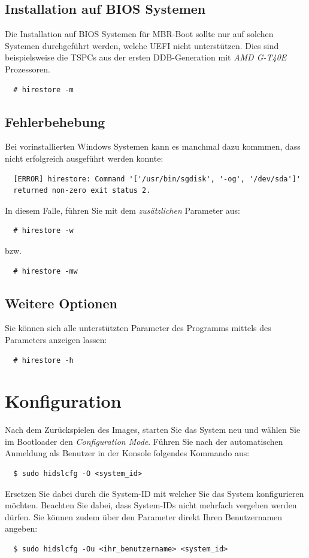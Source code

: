\documentclass[a4paper,11pt,authoryear]{article}
\begin{document}
\subsection{Installation auf BIOS Systemen}
Die Installation auf BIOS Systemen für MBR-Boot sollte nur auf solchen Systemen durchgeführt werden, welche UEFI nicht unterstützen.
Dies sind beispielsweise die TSPCs aus der ersten DDB-Generation mit \emph{AMD G-T40E} Prozessoren.
\begin{verbatim}
  # hirestore -m
\end{verbatim}
\subsection{Fehlerbehebung}
Bei vorinstallierten Windows Systemen kann es manchmal dazu kommmen, dass  nicht erfolgreich ausgeführt werden konnte:
\begin{verbatim}
  [ERROR] hirestore: Command '['/usr/bin/sgdisk', '-og', '/dev/sda']' 
  returned non-zero exit status 2.
\end{verbatim}
In diesem Falle, führen Sie  mit dem \emph{zusätzlichen} Parameter  aus:
\begin{verbatim}
  # hirestore -w
\end{verbatim}
bzw.
\begin{verbatim}
  # hirestore -mw
\end{verbatim}
\subsection{Weitere Optionen}
Sie können sich alle unterstützten Parameter des Programms  mittels des Parameters  anzeigen lassen:
\begin{verbatim}
  # hirestore -h
\end{verbatim}

\section{Konfiguration}
Nach dem Zurückspielen des Images, starten Sie das System neu und wählen Sie im Bootloader den \emph{Configuration Mode}.
Führen Sie nach der automatischen Anmeldung als Benutzer  in der Konsole folgendes Kommando aus:
\begin{verbatim}
  $ sudo hidslcfg -O <system_id>
\end{verbatim}
Ersetzen Sie dabei  durch die System-ID mit welcher Sie das System konfigurieren möchten.
Beachten Sie dabei, dass System-IDs nicht mehrfach vergeben werden dürfen.
Sie können zudem über den Parameter  direkt Ihren Benutzernamen angeben:
\begin{verbatim}
  $ sudo hidslcfg -Ou <ihr_benutzername> <system_id>
\end{verbatim}
\end{document}

